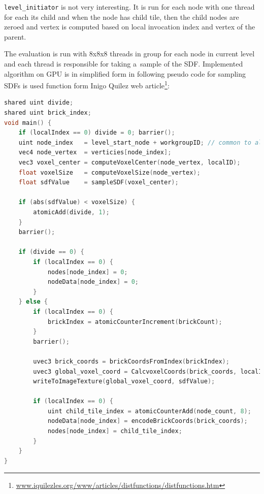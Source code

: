 \documentclass[11pt, a4paper]{article}
\begin{document}
\texttt{level\_initiator} is not very interesting.
It is run for each node with one thread for each its child and when the node has child tile, then the child nodes are zeroed and vertex is computed based on local invocation index and vertex of the parent.

The evaluation is run with 8x8x8 threads in group for each node in current level and each thread is responsible for taking a~sample of the SDF.
Implemented algorithm on GPU is in simplified form in following pseudo code for sampling SDFs is used function form Inigo Quilez web article\footnote{\href{https://iquilezles.org/www/articles/distfunctions/distfunctions.htm}{www.iquilezles.org/www/articles/distfunctions/distfunctions.htm}}:


\begin{lstlisting}[language=C++]
shared uint divide;
shared uint brick_index;
void main() {
    if (localIndex == 0) divide = 0; barrier();
    uint node_index   = level_start_node + workgroupID; // common to all voxels
    vec4 node_vertex  = verticies[node_index];
    vec3 voxel_center = computeVoxelCenter(node_vertex, localID);
    float voxelSize   = computeVoxelSize(node_vertex);
    float sdfValue    = sampleSDF(voxel_center);
    
    if (abs(sdfValue) < voxelSize) {
        atomicAdd(divide, 1);
    }
    barrier();
    
    if (divide == 0) {
        if (localIndex == 0) {
            nodes[node_index] = 0;
            nodeData[node_index] = 0;
        }
    } else {
        if (localIndex == 0) {
            brickIndex = atomicCounterIncrement(brickCount);
        }
        barrier();
        
        uvec3 brick_coords = brickCoordsFromIndex(brickIndex);
        uvec3 global_voxel_coord = CalcvoxelCoords(brick_coords, localID);
        writeToImageTexture(global_voxel_coord, sdfValue);
        
        if (localIndex == 0) {
            uint child_tile_index = atomicCounterAdd(node_count, 8);
            nodeData[node_index] = encodeBrickCoords(brick_coords);
            nodes[node_index] = child_tile_index;
        }
    }
}
\end{lstlisting}
\end{document}
